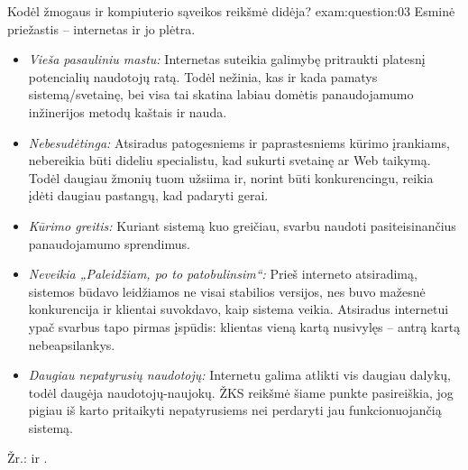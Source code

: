 \begin{question}{%
  Kodėl žmogaus ir kompiuterio sąveikos reikšmė didėja?
  }{exam:question:03}
  Esminė priežastis – internetas ir jo plėtra. 
  \begin{itemize}
    \item \emph{Vieša pasauliniu mastu:}
      Internetas suteikia galimybę pritraukti platesnį potencialių
      naudotojų ratą. Todėl nežinia, kas ir kada pamatys
      sistemą/svetainę, bei visa tai skatina labiau domėtis
      panaudojamumo inžinerijos metodų kaštais ir nauda.
    \item \emph{Nebesudėtinga:}
      Atsiradus patogesniems ir paprastesniems kūrimo įrankiams,
      nebereikia būti dideliu specialistu, kad sukurti svetainę ar Web
      taikymą. Todėl daugiau žmonių tuom užsiima ir, norint būti
      konkurencingu, reikia įdėti daugiau pastangų, kad padaryti
      gerai.
    \item \emph{Kūrimo greitis:}
      Kuriant sistemą kuo greičiau, svarbu naudoti pasiteisinančius
      panaudojamumo sprendimus.
    \item \emph{Neveikia „Paleidžiam, po to patobulinsim“:}
      Prieš interneto atsiradimą, sistemos  būdavo leidžiamos ne
      visai stabilios versijos, nes buvo mažesnė konkurencija ir
      klientai suvokdavo, kaip sistema veikia. Atsiradus internetui
      ypač svarbus tapo  pirmas įspūdis: klientas vieną kartą
      nusivylęs – antrą kartą nebeapsilankys.
    \item \emph{Daugiau nepatyrusių naudotojų:}
      Internetu galima atlikti vis daugiau dalykų, todėl daugėja
      naudotojų-naujokų. ŽKS reikšmė šiame punkte pasireiškia,
      jog pigiau iš karto pritaikyti nepatyrusiems nei perdaryti jau
      funkcionuojančią sistemą.
  \end{itemize}
  Žr.: \cite[28--29]{skaidres-1} ir \cite[38--48]{skaidres-1}.
\end{question}

